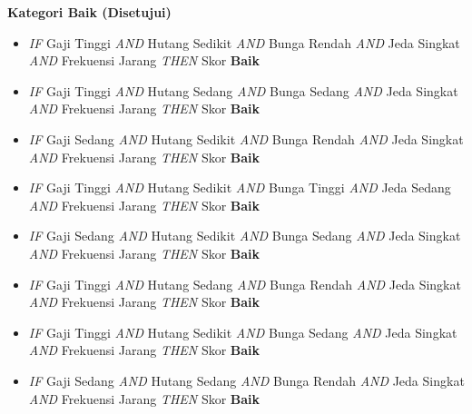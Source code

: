 \documentclass[12pt,a4paper]{report}
\begin{document}
\noindent\textbf{Kategori Baik (Disetujui)}
\begin{itemize}
  \item[R01] \textit{IF} Gaji Tinggi \textit{AND} Hutang Sedikit \textit{AND} Bunga Rendah \textit{AND} Jeda Singkat \textit{AND} Frekuensi Jarang \textit{THEN} Skor \textbf{Baik}
  \item[R02] \textit{IF} Gaji Tinggi \textit{AND} Hutang Sedang \textit{AND} Bunga Sedang \textit{AND} Jeda Singkat \textit{AND} Frekuensi Jarang \textit{THEN} Skor \textbf{Baik}
  \item[R03] \textit{IF} Gaji Sedang \textit{AND} Hutang Sedikit \textit{AND} Bunga Rendah \textit{AND} Jeda Singkat \textit{AND} Frekuensi Jarang \textit{THEN} Skor \textbf{Baik}
  \item[R04] \textit{IF} Gaji Tinggi \textit{AND} Hutang Sedikit \textit{AND} Bunga Tinggi \textit{AND} Jeda Sedang \textit{AND} Frekuensi Jarang \textit{THEN} Skor \textbf{Baik}
  \item[R16] \textit{IF} Gaji Sedang \textit{AND} Hutang Sedikit \textit{AND} Bunga Sedang \textit{AND} Jeda Singkat \textit{AND} Frekuensi Jarang \textit{THEN} Skor \textbf{Baik}
  \item[R17] \textit{IF} Gaji Tinggi \textit{AND} Hutang Sedang \textit{AND} Bunga Rendah \textit{AND} Jeda Singkat \textit{AND} Frekuensi Jarang \textit{THEN} Skor \textbf{Baik}
  \item[R23] \textit{IF} Gaji Tinggi \textit{AND} Hutang Sedikit \textit{AND} Bunga Sedang \textit{AND} Jeda Singkat \textit{AND} Frekuensi Jarang \textit{THEN} Skor \textbf{Baik}
  \item[R24] \textit{IF} Gaji Sedang \textit{AND} Hutang Sedang \textit{AND} Bunga Rendah \textit{AND} Jeda Singkat \textit{AND} Frekuensi Jarang \textit{THEN} Skor \textbf{Baik}
\end{itemize}
\end{document}
